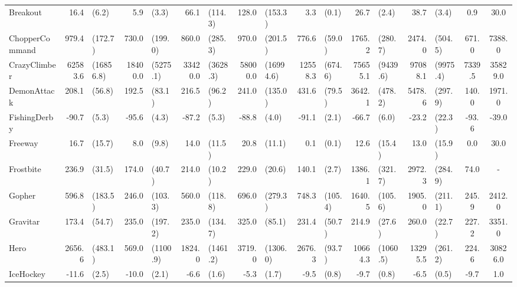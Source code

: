\begin{landscape}
\begin{changemargin}{0cm}{0cm}
\begin{center}
\begin{table}[!htbp]
\begin{tabular}{l|rl|rl|rl|rl|rl|rl|rl|c|c}
Breakout       &     16.4 &      (6.2) &      5.9 &     (3.3) &       66.1 &      (114.3) &    128.0 &    (153.3) &      3.3 &    (0.1) &     26.7 &      (2.4) &      38.7 &      (3.4) &      0.9 &     30.0 \\
ChopperCommand &    979.4 &    (172.7) &    730.0 &   (199.0) &      860.0 &      (285.3) &    970.0 &    (201.5) &    776.6 &   (59.0) &   1765.2 &    (280.7) &    2474.0 &    (504.5) &    671.0 &   7388.0 \\
CrazyClimber   &  62583.6 &  (16856.8) &  18400.0 &  (5275.1) &    33420.0 &     (3628.3) &  58000.0 &  (16994.6) &  12558.3 &  (674.6) &  75655.1 &   (9439.6) &   97088.1 &   (9975.4) &   7339.5 &  35829.0 \\
DemonAttack    &    208.1 &     (56.8) &    192.5 &    (83.1) &      216.5 &       (96.2) &    241.0 &    (135.0) &    431.6 &   (79.5) &   3642.1 &    (478.2) &    5478.6 &    (297.9) &    140.0 &   1971.0 \\
FishingDerby   &    -90.7 &      (5.3) &    -95.6 &     (4.3) &      -87.2 &        (5.3) &    -88.8 &      (4.0) &    -91.1 &    (2.1) &    -66.7 &      (6.0) &     -23.2 &     (22.3) &    -93.6 &    -39.0 \\
Freeway        &     16.7 &     (15.7) &      8.0 &     (9.8) &       14.0 &       (11.5) &     20.8 &     (11.1) &      0.1 &    (0.1) &     12.6 &     (15.4) &      13.0 &     (15.9) &      0.0 &     30.0 \\
Frostbite      &    236.9 &     (31.5) &    174.0 &    (40.7) &      214.0 &       (10.2) &    229.0 &     (20.6) &    140.1 &    (2.7) &   1386.1 &    (321.7) &    2972.3 &    (284.9) &     74.0 &      - \\
Gopher         &    596.8 &    (183.5) &    246.0 &   (103.3) &      560.0 &      (118.8) &    696.0 &    (279.3) &    748.3 &  (105.4) &   1640.5 &    (105.6) &    1905.0 &    (211.1) &    245.9 &   2412.0 \\
Gravitar       &    173.4 &     (54.7) &    235.0 &   (197.2) &      235.0 &      (134.7) &    325.0 &     (85.1) &    231.4 &   (50.7) &    214.9 &     (27.6) &     260.0 &     (22.7) &    227.2 &   3351.0 \\
Hero           &   2656.6 &    (483.1) &    569.0 &  (1100.9) &     1824.0 &     (1461.2) &   3719.0 &   (1306.0) &   2676.3 &   (93.7) &  10664.3 &   (1060.5) &   13295.5 &    (261.2) &    224.6 &  30826.0 \\
IceHockey      &    -11.6 &      (2.5) &    -10.0 &     (2.1) &       -6.6 &        (1.6) &     -5.3 &      (1.7) &     -9.5 &    (0.8) &     -9.7 &      (0.8) &      -6.5 &      (0.5) &     -9.7 &      1.0 \\

\end{tabular}
\end{table}
\end{center}
\end{changemargin}
\end{landscape}
